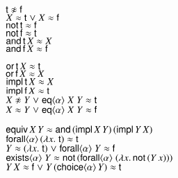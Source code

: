 \noindent
\begin{minipage}[t]{.2\textwidth}
\begin{center}
$\cst{t} \noteq \cst{f}$ \\
$X \approx \mathsf{t} \mathrel\lor X \approx \mathsf{f}$ \\
$\mathsf{not} \, \mathsf{t} \approx \mathsf{f}$ \\
$\mathsf{not} \, \mathsf{f} \approx \mathsf{t}$ \\
$\mathsf{and} \, \mathsf{t} \, X \approx X $ \\
$\mathsf{and} \, \mathsf{f} \, X \approx \mathsf{f} $ \\ 
\end{center}
\end{minipage}%
\begin{minipage}[t]{.35\textwidth}
\begin{center}
$\mathsf{or} \, \mathsf{t} \, X \approx \mathsf{t} $ \\
$\mathsf{or} \, \mathsf{f} \, X \approx X $ \\
$\mathsf{impl} \, \mathsf{t} \, X \approx X $ \\
$\mathsf{impl} \, \mathsf{f} \, X \approx \mathsf{t} $ \\
$X \noteq Y \llor \cst{eq}\typeargs{\alpha}\;X\;Y \eq \cst{t}$ \\
$X \approx Y \mathrel\lor \mathsf{eq}{\langle\alpha\rangle}\;X\;Y \approx \mathsf{f}$
\end{center}
\end{minipage}%
\begin{minipage}[t]{.45\textwidth}
  \begin{center}
    $\mathsf{equiv} \, X\, Y \approx \mathsf{and} \, (\mathsf{impl} \, X\, Y) \, (\mathsf{impl} \, Y \, X) $ \\
    $\mathsf{forall}{\langle\alpha\rangle}\,(\lambda x.\; \mathsf{t}) \approx \mathsf{t}$ \\
    $Y \approx (\lambda x.\; \mathsf{t}) \mathrel\lor \mathsf{forall}{\langle\alpha\rangle}\;Y \approx \mathsf{f}$ \\
    $\mathsf{exists}{\langle\alpha\rangle}\;Y \approx \mathsf{not} \, (\mathsf{forall}{\langle\alpha\rangle}\;(\lambda x. \, \mathsf{not} \, (Y \, x)))$ \\
    $Y \, X \approx \mathsf{f} \mathrel\lor Y \, (\textsf{choice}{\langle\alpha\rangle} \, Y) \approx \mathsf{t}$ \\
   
  \end{center}
\end{minipage}

\vspace{0.5em}


